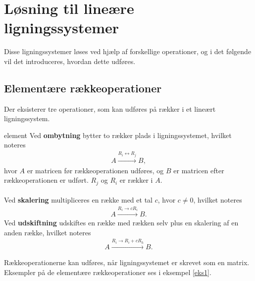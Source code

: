 \section{Løsning til lineære ligningssystemer}
%
Disse ligningssystemer løses ved hjælp af forskellige operationer, og i det følgende vil det introduceres, hvordan dette udføres.
%
\subsection{Elementære rækkeoperationer}
Der eksisterer tre operationer, som kan udføres på rækker i et lineært ligningssystem.
%
\begin{defn}{}{element}
Ved \textbf{ombytning} bytter to rækker plads i ligningssystemet, hvilket noteres
\begin{align*}
A \xrightarrow{R_i \leftrightarrow R_j} B, 
\end{align*}
hvor $A$ er matricen før rækkeoperationen udføres, og $B$ er matricen efter rækkeoperationen er udført. 
$R_j$ og $R_i$ er rækker i $A$.\\\\
Ved \textbf{skalering} multipliceres en række med et tal $c$, hvor $c \neq 0$, hvilket noteres
\begin{align*}
A \xrightarrow{R_i \rightarrow cR_i} B.
\end{align*}
Ved \textbf{udskiftning} udskiftes en række med rækken selv plus en skalering af en anden række, hvilket noteres
\begin{align*}
A \xrightarrow{R_i \rightarrow R_i + cR_h} B.
\end{align*}
%
\end{defn}
\noindent
Rækkeoperationerne kan udføres, når ligningssystemet er skrevet som en matrix. Eksempler på de elementære rækkeoperationer ses i eksempel \ref{eks1}.
\\
%
%
